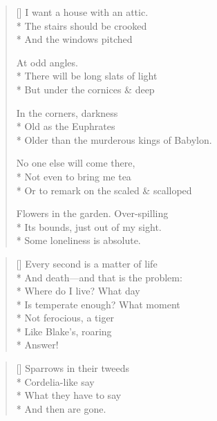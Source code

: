 \begingroup
{}
\label{ch:solitudes}

\renewcommand{\poemtoc}{subsection}

\label{ch:attic_room}
\settowidth{\versewidth}{Older than the murderous kings of Babylon.}
\begin{verse}[\versewidth]
I want a house with an attic.\\*
The stairs should be crooked\\*
And the windows pitched

At odd angles.\\*
There will be long slats of light\\*
But under the cornices \& deep

In the corners, darkness\\*
Old as the Euphrates\\*
Older than the murderous kings of Babylon.

No one else will come there,\\*
Not even to bring me tea\\*
Or to remark on the scaled \& scalloped

Flowers in the garden. Over-spilling\\*
Its bounds, just out of my sight.\\*
Some loneliness is absolute.
\end{verse}

\clearpage
{}
\label{ch:May}
\settowidth{\versewidth}{Is temperate enough? What moment}
\begin{verse}[\versewidth]
Every second is a matter of life\\*
And death---and that is the problem:\\*
Where do I live? What day\\*
Is temperate enough? What moment\\*
Not ferocious, a tiger\\*
Like Blake's, roaring\\*
Answer!
\end{verse}

\clearpage
{}
\label{ch:speech}
\settowidth{\versewidth}{Sparrows in their tweeds}
\begin{verse}[\versewidth]
Sparrows in their tweeds\\*
Cordelia-like say\\*
What they have to say\\*
And then are gone.
\end{verse}
\endgroup